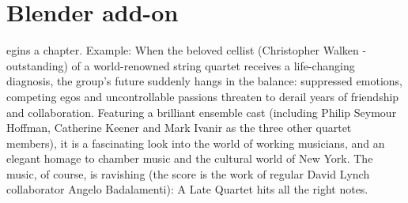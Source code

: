 %
%
\let\textcircled=\pgftextcircled
\chapter{Blender add-on}
\label{chap:blender_add_on}

egins a chapter. Example: When the beloved cellist (Christopher Walken - outstanding) of a world-renowned string quartet receives a life-changing diagnosis, the group's future suddenly hangs in the balance: suppressed emotions, competing egos and uncontrollable passions threaten to derail years of friendship and collaboration. Featuring a brilliant ensemble cast (including Philip Seymour Hoffman, Catherine Keener and Mark Ivanir as the three other quartet members), it is a fascinating look into the world of working musicians, and an elegant homage to chamber music and the cultural world of New York. The music, of course, is ravishing (the score is the work of regular David Lynch collaborator Angelo Badalamenti): A Late Quartet hits all the right notes.

